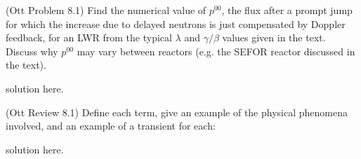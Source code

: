 \documentclass[11pt,addpoints,answers]{exam}
\begin{document}
\begin{questions}

        
        \question[30] (Ott Problem 8.1) Find the numerical value of $p^{00}$, 
        the flux after a prompt jump for which the increase due to delayed 
        neutrons is just compensated by Doppler feedback, for an LWR from the 
        typical $\lambda$ and $\gamma/\beta$ values given in the text. Discuss 
        why $p^{00}$ may vary between reactors (e.g. the SEFOR reactor 
        discussed in the text).

        \begin{solution}
                solution here.
        \end{solution}

        \question[15] (Ott Review 8.1) Define each term, give an example of the 
        physical phenomena involved, and an example of a transient for each: 
        \begin{solution}
                solution here.
        \end{solution}
       
       
\end{questions}



%
%
\end{document}
